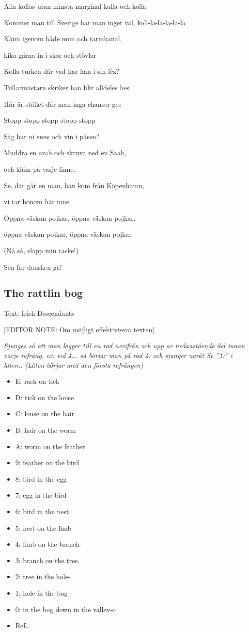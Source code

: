 Alla kollas utan minsta marginal kolla och kolla

Kommer man till Sverige har man inget val, koll-la-la-la-la-la

Känn igenom både mun och tarmkanal,

kika gärna in i skor och stövlar

Kolla turken där vad har han i sin féz?

Tullarmästarn skriker han blir alldeles hes

Här är stället där man inga chanser ges

Stopp stopp stopp stopp stopp

Säg har ni snus och vin i påsen?

Muddra en arab och skruva ned en Saab,

och kläm på varje finne.

Se, där går en man, han kom från Köpenhamn,

vi tar honom här inne

Öppna väskan pojkar, öppna väskan pojkar,

öppna väskan pojkar, öppna väskan pojkar

(Nå så, släpp min taske!)

Sen får dansken gå!\bigskip



\subsection{\textbf{The rattlin bog }}

Text: Irish Descendants\bigskip

[EDITOR NOTE: Om möjligt effektivisera texten]

\emph{Sjunges så att man lägger till en rad nerifrån och upp av
nedanstående del innan varje refräng. ex: vid 4... så börjar man
på rad 4: och sjunger neråt Se ”1:” i låten.. (Låten börjar med
den första refrängen)}

\begin{itemize}
    \item E: rash on tick
    \item D: tick on the louse
    \item C: louse on the hair
    \item B: hair on the worm
    \item A: worm on the feather
    \item 9: feather on the bird
    \item 8: bird in the egg
    \item 7: egg in the bird
    \item 6: bird in the nest
    \item 5: nest on the limb
    \item 4: limb on the branch-
    \item 3: branch on the tree,
    \item 2: tree in the hole-
    \item 1: hole in the bog -
    \item 0: in the bog down in the valley-o
    \item Ref…
\end{itemize}

